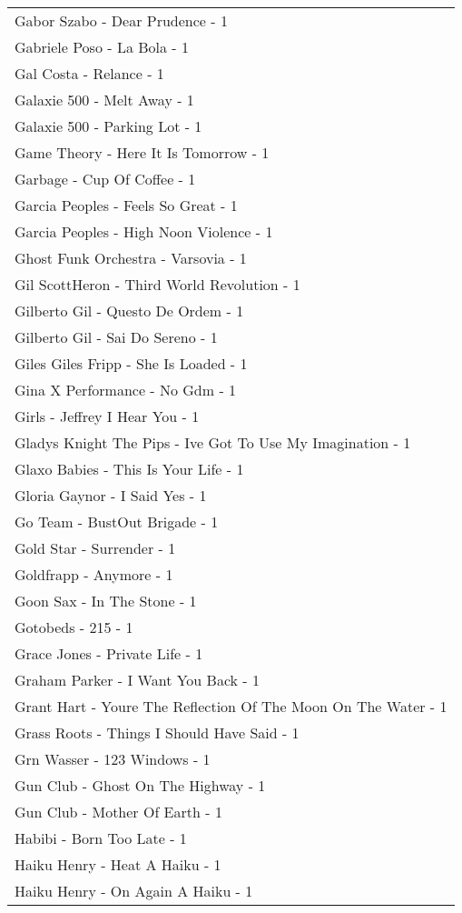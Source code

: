 \documentclass[
]{article}
\begin{document}
\begin{longtable}{l}
Gabor Szabo - Dear Prudence - 1 \\ 
Gabriele Poso - La Bola - 1 \\ 
Gal Costa - Relance - 1 \\ 
Galaxie 500 - Melt Away - 1 \\ 
Galaxie 500 - Parking Lot - 1 \\ 
Game Theory - Here It Is Tomorrow - 1 \\ 
Garbage - Cup Of Coffee - 1 \\ 
Garcia Peoples - Feels So Great - 1 \\ 
Garcia Peoples - High Noon Violence - 1 \\ 
Ghost Funk Orchestra - Varsovia - 1 \\ 
Gil ScottHeron - Third World Revolution - 1 \\ 
Gilberto Gil - Questo De Ordem - 1 \\ 
Gilberto Gil - Sai Do Sereno - 1 \\ 
Giles Giles Fripp - She Is Loaded - 1 \\ 
Gina X Performance - No Gdm - 1 \\ 
Girls - Jeffrey I Hear You - 1 \\ 
Gladys Knight The Pips - Ive Got To Use My Imagination - 1 \\ 
Glaxo Babies - This Is Your Life - 1 \\ 
Gloria Gaynor - I Said Yes - 1 \\ 
Go Team - BustOut Brigade - 1 \\ 
Gold Star - Surrender - 1 \\ 
Goldfrapp - Anymore - 1 \\ 
Goon Sax - In The Stone - 1 \\ 
Gotobeds - 215 - 1 \\ 
Grace Jones - Private Life - 1 \\ 
Graham Parker - I Want You Back - 1 \\ 
Grant Hart - Youre The Reflection Of The Moon On The Water - 1 \\ 
Grass Roots - Things I Should Have Said - 1 \\ 
Grn Wasser - 123 Windows - 1 \\ 
Gun Club - Ghost On The Highway - 1 \\ 
Gun Club - Mother Of Earth - 1 \\ 
Habibi - Born Too Late - 1 \\ 
Haiku Henry - Heat A Haiku - 1 \\ 
Haiku Henry - On Again A Haiku - 1 \\ 

\end{longtable}
\end{document}
